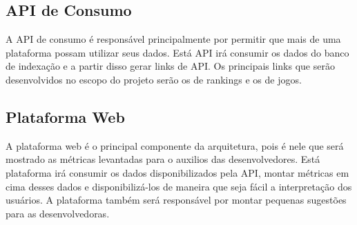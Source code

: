 \subsection*{API de Consumo}
A API de consumo é responsável principalmente por permitir que mais de uma plataforma possam utilizar seus dados. Está API irá consumir os dados do banco de indexação e a partir disso gerar links de API. Os principais links que serão desenvolvidos no escopo do projeto serão os de rankings e os de jogos.
\subsection*{Plataforma Web}
A plataforma web é o principal componente da arquitetura, pois é nele que será mostrado as métricas levantadas para o auxilios das desenvolvedores. Está plataforma irá consumir os dados disponibilizados pela API, montar métricas em cima desses dados e disponibilizá-los de maneira que seja fácil a interpretação dos usuários. A plataforma também será responsável por montar pequenas sugestões para as desenvolvedoras.